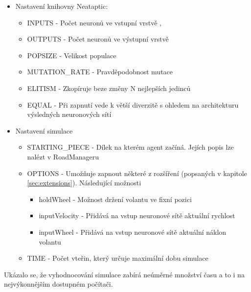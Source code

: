 \begin{itemize}
	\item Nastavení knihovny Neataptic:
	\begin{itemize}
		\item INPUTS - Počet neuronů ve vstupní vrstvě ,
		\item OUTPUTS - Počet neuronů ve výstupní vrstvě
		\item POPSIZE - Velikost populace
		\item MUTATION\_RATE - Pravděpodobnost mutace
		\item ELITISM - Zkopíruje beze změny N nejlepších jedinců
		\item EQUAL - Při zapnutí vede k větší diverzitě s ohledem na architekturu výsledných neuronových sítí
	\end{itemize}
	\item Nastavení simulace
	\begin{itemize}
		\item STARTING\_PIECE - Dílek na kterém agent začíná. Jejích popis lze nalézt v RoadManageru
		\item OPTIONS - Umožňuje zapnout některé z rozšíření (popsaných v kapitole \ref{sec:extensions}). Následující možnosti
		\begin{itemize}
			\item holdWheel - Možnost držení volantu ve fixní pozici
			\item inputVelocity - Přidává na vstup neuronové sítě aktuální rychlost
			\item inputWheel - Přidává na vstup neuronové sítě aktuální náklon volantu
		\end{itemize}
		\item TIME - Počet vteřin, který určuje maximální dobu simulace
	\end{itemize}
\end{itemize}

\label{sec:cluster}
Ukázalo se, že vyhodnocování simulace zabírá neúměrné množství času a to i na nejvýkonnějším dostupném počítači.

